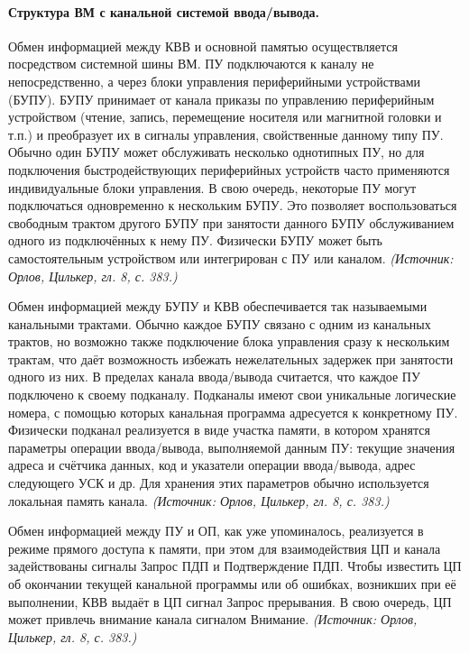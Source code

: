 \documentclass[a4paper,12pt]{article}
\begin{document}
\paragraph{Структура ВМ с канальной системой ввода/вывода.}
Обмен информацией между КВВ и основной памятью осуществляется посредством системной шины ВМ. ПУ подключаются к каналу не непосредственно, а через блоки управления периферийными устройствами (БУПУ). БУПУ принимает от канала приказы по управлению периферийным устройством (чтение, запись, перемещение носителя или магнитной головки и т.п.) и преобразует их в сигналы управления, свойственные данному типу ПУ. Обычно один БУПУ может обслуживать несколько однотипных ПУ, но для подключения быстродействующих периферийных устройств часто применяются индивидуальные блоки управления. В свою очередь, некоторые ПУ могут подключаться одновременно к нескольким БУПУ. Это позволяет воспользоваться свободным трактом другого БУПУ при занятости данного БУПУ обслуживанием одного из подключённых к нему ПУ. Физически БУПУ может быть самостоятельным устройством или интегрирован с ПУ или каналом.
\textit{(Источник: Орлов, Цилькер, гл. 8, с. 383.)}

Обмен информацией между БУПУ и КВВ обеспечивается так называемыми канальными трактами. Обычно каждое БУПУ связано с одним из канальных трактов, но возможно также подключение блока управления сразу к нескольким трактам, что даёт возможность избежать нежелательных задержек при занятости одного из них. В пределах канала ввода/вывода считается, что каждое ПУ подключено к своему подканалу. Подканалы имеют свои уникальные логические номера, с помощью которых канальная программа адресуется к конкретному ПУ. Физически подканал реализуется в виде участка памяти, в котором хранятся параметры операции ввода/вывода, выполняемой данным ПУ: текущие значения адреса и счётчика данных, код и указатели операции ввода/вывода, адрес следующего УСК и др. Для хранения этих параметров обычно используется локальная память канала.
\textit{(Источник: Орлов, Цилькер, гл. 8, с. 383.)}

Обмен информацией между ПУ и ОП, как уже упоминалось, реализуется в режиме прямого доступа к памяти, при этом для взаимодействия ЦП и канала задействованы сигналы Запрос ПДП и Подтверждение ПДП. Чтобы известить ЦП об окончании текущей канальной программы или об ошибках, возникших при её выполнении, КВВ выдаёт в ЦП сигнал Запрос прерывания. В свою очередь, ЦП может привлечь внимание канала сигналом Внимание.
\textit{(Источник: Орлов, Цилькер, гл. 8, с. 383.)}
\end{document}
